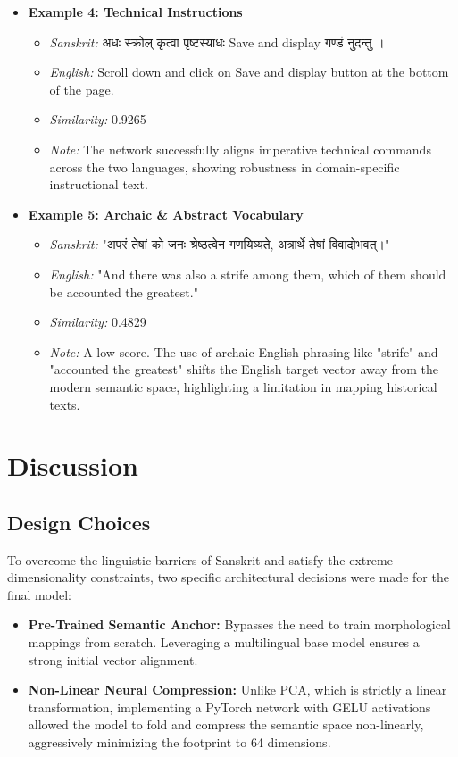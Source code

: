 \documentclass[11pt]{article}
\begin{document}
\begin{itemize}[leftmargin=*]
    \item \textbf{Example 4: Technical Instructions}
    \begin{itemize}
        \item \textit{Sanskrit:} अधः स्क्रोल् कृत्वा पृष्टस्याधः Save and display गण्डं नुदन्तु ।
        \item \textit{English:} Scroll down and click on Save and display button at the bottom of the page.
        \item \textit{Similarity:} 0.9265
        \item \textit{Note:} The network successfully aligns imperative technical commands across the two languages, showing robustness in domain-specific instructional text.
    \end{itemize}

    \item \textbf{Example 5: Archaic \& Abstract Vocabulary}
    \begin{itemize}
        \item \textit{Sanskrit:} "अपरं तेषां को जनः श्रेष्ठत्वेन गणयिष्यते, अत्रार्थे तेषां विवादोभवत्।"
        \item \textit{English:} "And there was also a strife among them, which of them should be accounted the greatest."
        \item \textit{Similarity:} 0.4829
        \item \textit{Note:} A low score. The use of archaic English phrasing like "strife" and "accounted the greatest" shifts the English target vector away from the modern semantic space, highlighting a limitation in mapping historical texts.
    \end{itemize}
\end{itemize}

\section{Discussion}
\subsection{Design Choices}
To overcome the linguistic barriers of Sanskrit and satisfy the extreme dimensionality constraints, two specific architectural decisions were made for the final model:
\begin{itemize}[leftmargin=*]
    \item \textbf{Pre-Trained Semantic Anchor:} Bypasses the need to train morphological mappings from scratch. Leveraging a multilingual base model ensures a strong initial vector alignment.
    \item \textbf{Non-Linear Neural Compression:} Unlike PCA, which is strictly a linear transformation, implementing a PyTorch network with GELU activations allowed the model to fold and compress the semantic space non-linearly, aggressively minimizing the footprint to 64 dimensions.
\end{itemize}
\end{document}
